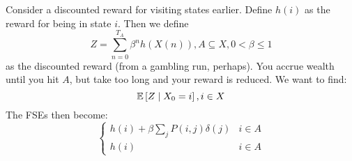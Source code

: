 \begin{note}
    Consider a discounted reward for visiting states earlier. Define $h(i)$ as the reward for being
    in state $i$. Then we define
    \[ Z = \sum_{n = 0}^{T_A} \beta^n h(X(n)), A \subseteq X, 0 < \beta \leq 1 \]
    as the discounted reward (from a gambling run, perhaps). You accrue wealth until you hit $A$,
    but take too long and your reward is reduced. We want to find:
    \[ \mathbb{E}\left[ Z \mid X_0 = i \right], i \in X \]
    The FSEs then become:
    \[ \begin{cases}
        h(i) + \beta \sum_j P(i, j) \delta(j) & i \in A \\
        h(i) & i \in A
    \end{cases} \]
\end{note}